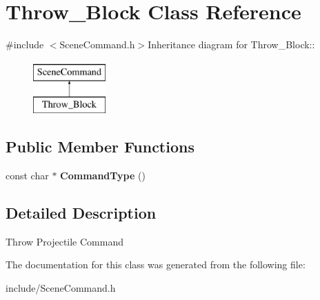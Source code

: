 \hypertarget{class_throw___block}{
\section{Throw\_\-Block Class Reference}
\label{class_throw___block}
}


{\ttfamily \#include $<$SceneCommand.h$>$}Inheritance diagram for Throw\_\-Block::\begin{figure}[H]
\begin{center}
\leavevmode
\includegraphics[height=2cm]{class_throw___block}
\end{center}
\end{figure}
\subsection*{Public Member Functions}
\begin{DoxyCompactItemize}
\item 
\hypertarget{class_throw___block_a37758fe83064c549e077143a1e876dc2}{
const char $\ast$ {\bfseries CommandType} ()}
\label{class_throw___block_a37758fe83064c549e077143a1e876dc2}

\end{DoxyCompactItemize}


\subsection{Detailed Description}
Throw Projectile Command 

The documentation for this class was generated from the following file:\begin{DoxyCompactItemize}
\item 
include/SceneCommand.h\end{DoxyCompactItemize}
